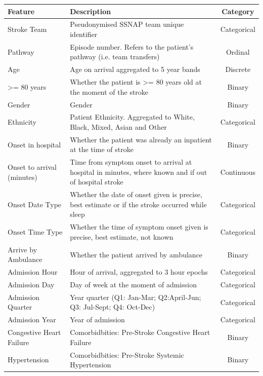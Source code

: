 \documentclass[12pt,a4paper, pdftex]{elsarticle}
\begin{document}
        \begin{longtable}{|l|p{8.5cm}|c|}
        \hline
        {\bf Feature} & {\bf Description} & {\bf Category} \\
        \hline
        \endhead
        \hline
        \endfoot
        \endlastfoot
        Stroke Team & Pseudonymised SSNAP team unique identifier & Categorical \\
        Pathway & Episode number. Refers to the patient's pathway (i.e. team transfers) & Ordinal \\
        Age & Age on arrival aggregated to 5 year bands & Discrete \\
        >= 80 years & Whether the patient is >= 80 years old at the moment of the stroke & Binary \\
        Gender & Gender & Binary \\
        Ethnicity & Patient Ethnicity. Aggregated to White, Black, Mixed, Asian and Other & Categorical \\
        Onset in hospital & Whether the patient was already an inpatient at the time of stroke & Binary \\
        Onset to arrival (minutes) & Time from symptom onset to arrival at hospital in minutes, where known and if out of hospital stroke & Continuous \\
        Onset Date Type & Whether the date of onset given is precise, best estimate or if the stroke occurred while sleep & Categorical \\
        Onset Time Type & Whether the time of symptom onset given is precise, best estimate, not known & Categorical \\
        Arrive by Ambulance & Whether the patient arrived by ambulance & Binary \\
        Admission Hour & Hour of arrival, aggregated to 3 hour epochs & Categorical \\
        Admission Day & Day of week at the moment of admission & Categorical \\
        Admission Quarter & Year quarter (Q1: Jan-Mar; Q2:April-Jun; Q3: Jul-Sept; Q4: Oct-Dec) & Categorical \\
        Admission Year & Year of admission & Categorical \\
        Congestive Heart Failure &Comorbidbities: Pre-Stroke Congestive Heart Failure  & Binary \\
        Hypertension & Comorbidbities: Pre-Stroke Systemic Hypertension & Binary \\

\end{longtable}
\end{document}
